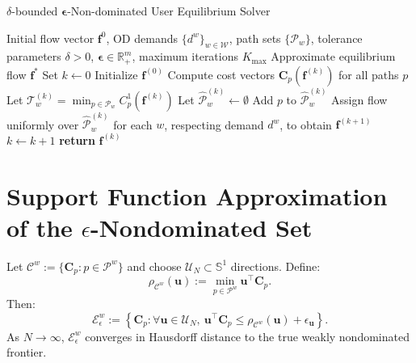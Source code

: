 \documentclass[11pt]{article}
\begin{document}
\begin{algorithm}[H]
\caption{$\delta$-bounded $\boldsymbol{\epsilon}$-Non-dominated User Equilibrium Solver}
\label{alg:delta-eps-ebr-mue}
\begin{algorithmic}[1]
\Require Initial flow vector \(\mathbf{f}^0\), OD demands \(\{d^w\}_{w \in \mathcal{W}}\), path sets \(\{\mathcal{P}_w\}\), tolerance parameters \(\delta > 0\), \(\boldsymbol{\epsilon} \in \mathbb{R}^m_+\), maximum iterations \(K_{\max}\)
\Ensure Approximate equilibrium flow \(\mathbf{f}^\ast\)
\State Set \(k \gets 0\)
\State Initialize \(\mathbf{f}^{(0)}\)
\Repeat
    \State Compute cost vectors \(\mathbf{C}_p(\mathbf{f}^{(k)})\) for all paths \(p\)
        \State Let \(\mathcal{T}_w^{(k)} = \min_{p \in \mathcal{P}_w} C^1_p(\mathbf{f}^{(k)})\) 
        \State Let \(\hat{\mathcal{P}}_w^{(k)} \gets \emptyset\)
                \State Add \(p\) to \(\hat{\mathcal{P}}_w^{(k)}\)
            \EndIf
        \EndFor
    \EndFor
    \State Assign flow uniformly over \(\hat{\mathcal{P}}_w^{(k)}\) for each \(w\), respecting demand \(d^w\), to obtain \(\mathbf{f}^{(k+1)}\)
    \State \(k \gets k + 1\)
\State \textbf{return} \(\mathbf{f}^{(k)}\)
\end{algorithmic}
\end{algorithm}




\section{Support Function Approximation of the \texorpdfstring{$\epsilon$}{epsilon}-Nondominated Set}

Let $\mathcal{C}^w := \{ \mathbf{C}_p : p \in \mathcal{P}^w \}$ and choose $\mathcal{U}_N \subset \mathbb{S}^1$ directions. Define:
\[
\rho_{\mathcal{C}^w}(\mathbf{u}) := \min_{p \in \mathcal{P}^w} \mathbf{u}^\top \mathbf{C}_p.
\]
Then:
\[
\mathcal{E}_\epsilon^w := \left\{ \mathbf{C}_p : \forall \mathbf{u} \in \mathcal{U}_N,\ \mathbf{u}^\top \mathbf{C}_p \le \rho_{\mathcal{C}^w}(\mathbf{u}) + \epsilon_\mathbf{u} \right\}.
\]
As $N \to \infty$, $\mathcal{E}_\epsilon^w$ converges in Hausdorff distance to the true weakly nondominated frontier.
\end{document}

